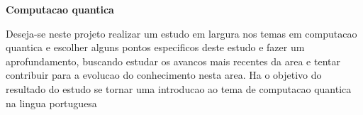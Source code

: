 \documentclass[a4paper,10pt]{article}
\author{Alex Bredariol Grilo}
\begin{document}
\textbf{Computacao quantica}

Deseja-se neste projeto realizar um estudo em largura nos temas em computacao quantica e
escolher alguns pontos especificos deste estudo e fazer um aprofundamento, buscando
estudar os avancos mais recentes da area e tentar contribuir para a
evolucao do conhecimento nesta area. Ha o objetivo do resultado do estudo se tornar uma introducao ao tema de computacao
quantica na lingua portuguesa
\end{document}
